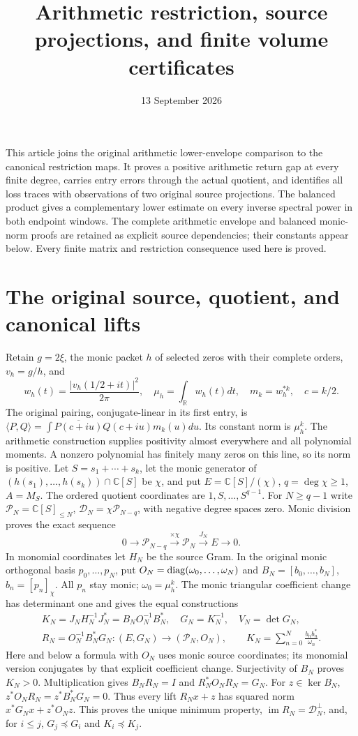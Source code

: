 \documentclass[11pt]{article}
\title{Arithmetic restriction, source projections, and finite volume certificates}
\author{}\date{13 September 2026}
\newcommand{\C}{\mathbb C}\newcommand{\R}{\mathbb R}
\begin{document}
\maketitle
This article joins the original arithmetic lower-envelope comparison to
the canonical restriction maps. It proves a positive arithmetic return
gap at every finite degree, carries entry errors through the actual
quotient, and identifies all loss traces with observations of two
original source projections. The balanced product gives a complementary
lower estimate on every inverse spectral power in both endpoint windows.
The complete arithmetic envelope and balanced monic-norm proofs are
retained as explicit source dependencies; their constants appear below.
Every finite matrix and restriction consequence used here is proved.

\section{The original source, quotient, and canonical lifts}
Retain $g=2\xi$, the monic packet $h$ of selected zeros with their
complete orders, $v_h=g/h$, and
\[
 w_h(t)=\frac{|v_h(1/2+it)|^2}{2\pi},\quad
 \mu_h=\int_\R w_h(t)dt,\quad m_k=w_h^{*k},\quad c=k/2.
 \tag{ERJ.1}
\]
The original pairing, conjugate-linear in its first entry, is
$\langle P,Q\rangle=\int\overline{P(c+iu)}Q(c+iu)m_k(u)du$.
Its constant norm is $\mu_h^k$. The arithmetic construction supplies
positivity almost everywhere and all polynomial moments. A nonzero
polynomial has finitely many zeros on this line, so its norm is positive.
Let $S=s_1+\cdots+s_k$, let the monic generator of
$(h(s_1),\ldots,h(s_k))\cap\C[S]$ be $\chi$, and put
$E=\C[S]/(\chi)$, $q=\deg\chi\ge1$, $A=M_S$.
The ordered quotient coordinates are $1,S,\ldots,S^{q-1}$.
For $N\ge q-1$ write $\mathcal P_N=\C[S]_{\le N}$,
$\mathcal D_N=\chi\mathcal P_{N-q}$, with negative degree spaces zero.
Monic division proves the exact sequence
\[
0\longrightarrow\mathcal P_{N-q}\xrightarrow{\times\chi}
\mathcal P_N\xrightarrow{J_N}E\longrightarrow0.\tag{ERJ.2}
\]
In monomial coordinates let $H_N$ be the source Gram. In the original
monic orthogonal basis $p_0,\ldots,p_N$, put
$O_N=\operatorname{diag}(\omega_0,\ldots,\omega_N)$ and
$B_N=[b_0,\ldots,b_N]$, $b_n=[p_n]_\chi$. All $p_n$ stay monic;
$\omega_0=\mu_h^k$. The monic triangular coefficient change has
determinant one and gives the equal constructions
\[
\begin{gathered}
 K_N=J_NH_N^{-1}J_N^*=B_NO_N^{-1}B_N^*,\quad
 G_N=K_N^{-1},\quad V_N=\det G_N,\\
 R_N=O_N^{-1}B_N^*G_N:(E,G_N)\longrightarrow(\mathcal P_N,O_N),
 \qquad K_N=\sum_{n=0}^N\frac{b_nb_n^*}{\omega_n}.
\end{gathered}\tag{ERJ.3}
\]
Here and below a formula with $O_N$ uses monic source coordinates;
its monomial version conjugates by that explicit coefficient change.
Surjectivity of $B_N$ proves $K_N>0$. Multiplication gives
$B_NR_N=I$ and $R_N^*O_NR_N=G_N$. For $z\in\ker B_N$,
$z^*O_NR_N=z^*B_N^*G_N=0$. Thus every lift $R_Nx+z$ has
squared norm $x^*G_Nx+z^*O_Nz$. This proves the unique minimum property,
$\operatorname{im}R_N=\mathcal D_N^\perp$, and, for $i\le j$,
$G_j\preceq G_i$ and $K_i\preceq K_j$.
\end{document}
